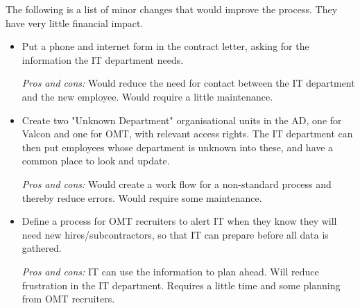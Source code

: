 The following is a list of minor changes that would improve the process.
They have very little financial impact.
\begin{itemize}
\item Put a phone and internet form in the contract letter, asking for the information the IT department needs.

\emph{Pros and cons:} Would reduce the need for contact between the IT department and the new employee.
Would require a little maintenance.

\item Create two "Unknown Department" organisational units in the AD, one for Valcon and one for OMT, with relevant access rights. The IT department can then put employees whose department is unknown into these, and have a common place to look and update.

\emph{Pros and cons:} Would create a work flow for a non-standard process and thereby reduce errors. Would require some maintenance.

\item Define a process for OMT recruiters to alert IT when they know they will need new hires/subcontractors, so that IT can prepare before all data is gathered.

\emph{Pros and cons:} IT can use the information to plan ahead. Will reduce frustration in the IT department. Requires a little time and some planning from OMT recruiters.
\end{itemize}

